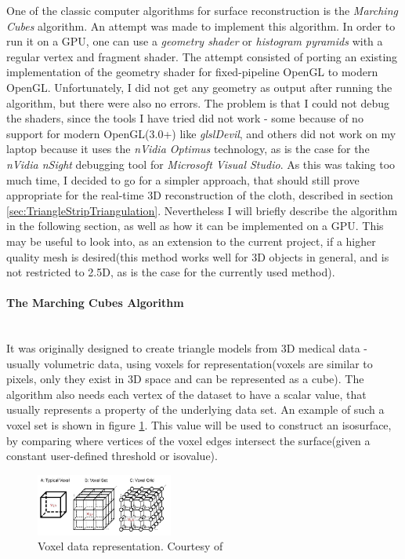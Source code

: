 \documentclass[]{article}
\begin{document}
One of the classic computer algorithms for surface reconstruction is the \textit{Marching Cubes}  algorithm. An attempt was made to implement this algorithm. In order to run it on a GPU, one can use a \textit{geometry shader} or\textit{ histogram pyramids} with a regular vertex and fragment shader. The attempt consisted of porting an existing implementation of the geometry shader for fixed-pipeline OpenGL to modern OpenGL. Unfortunately, I did not get any geometry as output after running the algorithm, but there were also no errors. The problem is that I could not debug the shaders, since the tools I have tried did not work - some because of no support for modern OpenGL(3.0+) like \textit{glslDevil}, and others did not work on my laptop because it uses the \textit{nVidia Optimus} technology, as is the case for the \textit{nVidia nSight} debugging tool for \textit{Microsoft Visual Studio}. As this was taking too much time, I decided to go for a simpler approach, that should still prove appropriate for the real-time 3D reconstruction of the cloth, described in section \ref{sec:TriangleStripTriangulation}. Nevertheless I will briefly describe the algorithm in the following section, as well as how it can be implemented on a GPU. This may be useful to look into, as an extension to the current project, if a higher quality mesh is desired(this method works well for 3D objects in general, and is not restricted to 2.5D, as is the case for the currently used method).

\paragraph{The Marching Cubes Algorithm}\mbox{}\\

It was originally designed to create triangle models  from 3D medical data - usually volumetric data, using voxels for representation(voxels are similar to pixels, only they exist in 3D space and can be represented as a cube). The algorithm also needs each vertex of the dataset to have a scalar value, that usually represents a property of the underlying data set. An example of such a voxel set is shown in figure \ref{fig:VoxelSet}. This value will be used to construct an isosurface, by comparing where vertices of the voxel edges intersect the surface(given a constant user-defined threshold or isovalue).

\begin{figure}[hbtp]
    \centering
    \includegraphics[width=0.4\textwidth]{figures/Voxels.PNG}
    \caption{Voxel data representation. Courtesy of \cite{navpreet2013}}
    \label{fig:VoxelSet}
\end{figure}
\end{document}
